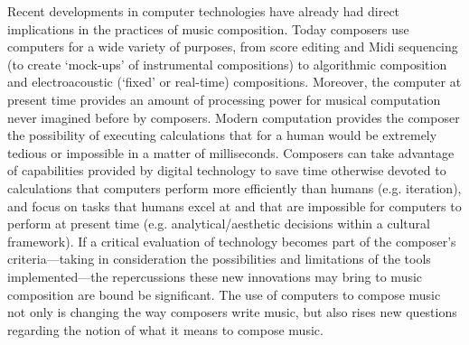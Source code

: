 Recent developments in computer technologies have already had direct implications in the practices of music composition. Today composers use computers for a wide variety of purposes, from score editing and Midi sequencing (to create `mock-ups' of instrumental compositions) to algorithmic composition and electroacoustic (`fixed' or real-time) compositions. Moreover, the computer at present time provides an amount of processing power for musical computation never imagined before by composers. Modern computation provides the composer the possibility of executing calculations that for a human would be extremely tedious or impossible in a matter of milliseconds. Composers can take advantage of capabilities provided by digital technology to save time otherwise devoted to calculations that computers perform more efficiently than humans (e.g. iteration), and focus on tasks that humans excel at and that are impossible for computers to perform at present time (e.g. analytical/aesthetic decisions  within a cultural framework). If a critical evaluation of technology becomes part of the composer's criteria---taking in consideration the possibilities and limitations of the tools implemented---the repercussions these new innovations may bring to music composition are bound be significant. The use of computers to compose music not only is changing the way composers write music, but also rises new questions regarding the notion of what it means to compose music.

